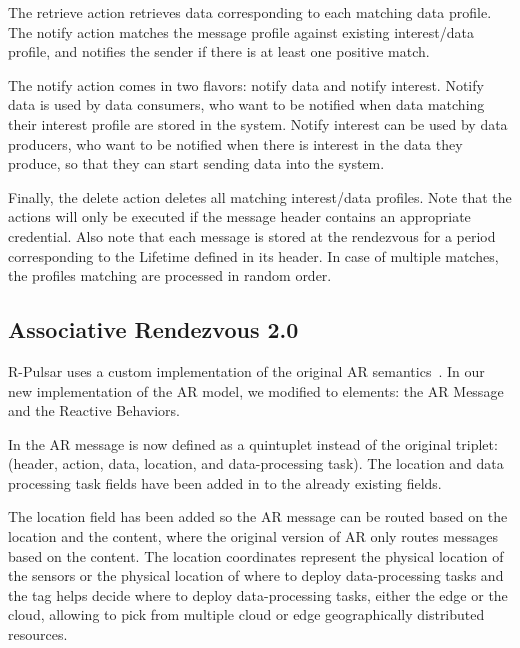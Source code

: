 The retrieve action retrieves data corresponding to each matching data profile. The notify action matches the message profile against existing interest/data profile, and notifies the sender if there is at least one positive match. 

The notify action comes in two flavors: notify data and notify interest. Notify data is used by data consumers, who want to be notified when data matching their interest profile are stored in the system. Notify interest can be used by data producers, who want to be notified when there is interest in the data they produce, so that they can start sending data into the system.

Finally, the delete action deletes all matching interest/data profiles. Note that the actions will only be executed if the message header contains an appropriate credential. Also note that each message is stored at the rendezvous for a period corresponding to the Lifetime defined in its header. In case of multiple matches, the profiles matching are processed in random order.

\subsection{Associative Rendezvous 2.0}\label{sec:semantics}
R-Pulsar uses a custom implementation of the original AR semantics~\cite{meteor2008}. In our new implementation of the AR model, we modified to elements: the AR Message and the Reactive Behaviors.

In the AR message is now defined as a quintuplet instead of the original triplet: (header, action, data, location, and data-processing task). The location and data processing task fields have been added in to the already existing fields.

The location field has been added so the AR message can be routed based on the location and the content, where the original version of AR only routes messages based on the content. The location coordinates represent the physical location of the sensors or the physical location of where to deploy data-processing tasks and the tag helps decide where to deploy data-processing tasks, either the edge or the cloud, allowing to pick from multiple cloud or edge geographically distributed resources.

